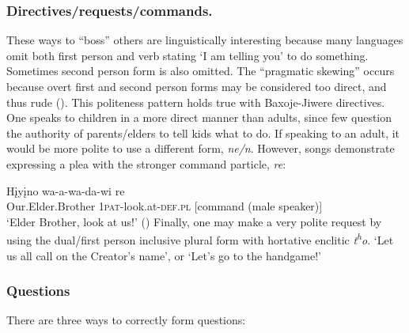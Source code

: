 \documentclass[output=paper]{LSP/langsci}
\begin{document}
\subsubsection{Directives/requests/commands.}  These ways to ``boss'' others are linguistically interesting because many languages omit both first person and verb stating `I am telling you' to do something.  Sometimes second person form is also omitted. The ``pragmatic skewing'' occurs because overt first and second person forms may be considered too direct, and thus rude (\citealt{Heath1998}). This politeness pattern holds true with Baxoje-Jiwere directives. One speaks to children in a more direct manner than adults, since few question the authority of parents/elders to tell kids what to do.  If speaking to an adult, it would be more polite to use a different form, \textit{ne/n}.  However, songs demonstrate expressing a plea with the stronger command particle, \textit{re}: 	     											

\ea \gll H\k{i}y\k{i}no    		 wa-a-wa-da-wi          re 	\\                                  	 
Our.Elder.Brother 1\textsc{pat}-look.at-\textsc{def.pl}  [command (male speaker)]	 \\	   	    
\trans `Elder Brother, look at us!'  (\citealt{Davidson1997})  	
\z				             
Finally, one may make a very polite request by using the dual/first person inclusive plural form with hortative enclitic \textit{t\textsuperscript{h}o}. `Let us all call on the Creator's name', or `Let's go to the handgame!'  		

\subsubsection{Questions} There are three ways to correctly form questions:  	
	          			
\end{document}
